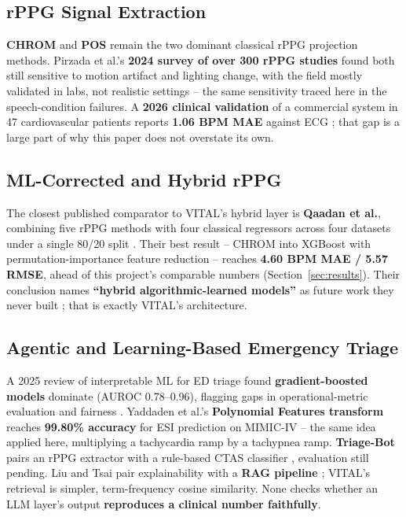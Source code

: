 \documentclass[conference]{IEEEtran}
\begin{document}
\subsection{\textbf{rPPG Signal Extraction}}
\textbf{CHROM} \cite{b_chrom} and \textbf{POS} \cite{b_pos_principles} remain the two dominant classical rPPG projection methods. Pirzada et al.'s \textbf{2024 survey of over 300 rPPG studies} found both still sensitive to motion artifact and lighting change, with the field mostly validated in labs, not realistic settings \cite{b_pirzada_review} -- the same sensitivity traced here in the speech-condition failures. A \textbf{2026 clinical validation} of a commercial system in 47 cardiovascular patients reports \textbf{1.06 BPM MAE} against ECG \cite{b_chin_clinical}; that gap is a large part of why this paper does not overstate its own.

\subsection{\textbf{ML-Corrected and Hybrid rPPG}}
The closest published comparator to VITAL's hybrid layer is \textbf{Qaadan et al.}, combining five rPPG methods with four classical regressors across four datasets under a single 80/20 split \cite{b_qaadan}. Their best result -- CHROM into XGBoost with permutation-importance feature reduction -- reaches \textbf{4.60 BPM MAE / 5.57 RMSE}, ahead of this project's comparable numbers (Section~\ref{sec:results}). Their conclusion names \textbf{``hybrid algorithmic-learned models''} as future work they never built \cite{b_qaadan}; that is exactly VITAL's architecture.

\subsection{\textbf{Agentic and Learning-Based Emergency Triage}}
A 2025 review of interpretable ML for ED triage found \textbf{gradient-boosted models} dominate (AUROC 0.78--0.96), flagging gaps in operational-metric evaluation and fairness \cite{b_jonatha_iml}. Yaddaden et al.'s \textbf{Polynomial Features transform} reaches \textbf{99.80\% accuracy} for ESI prediction on MIMIC-IV \cite{b_yaddaden} -- the same idea applied here, multiplying a tachycardia ramp by a tachypnea ramp. \textbf{Triage-Bot} pairs an rPPG extractor with a rule-based CTAS classifier \cite{b_sharma_triagebot}, evaluation still pending. Liu and Tsai pair explainability with a \textbf{RAG pipeline} \cite{b_liu_tsai_cds}; VITAL's retrieval is simpler, term-frequency cosine similarity. None checks whether an LLM layer's output \textbf{reproduces a clinical number faithfully}.
\end{document}
